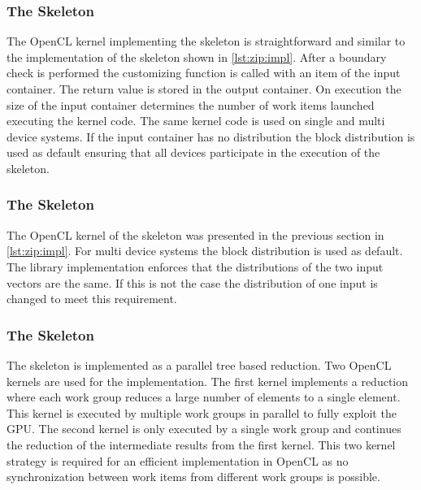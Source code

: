 \subsubsection{The \map Skeleton}
The OpenCL kernel implementing the \map skeleton is straightforward and similar to the implementation of the \zip skeleton shown in \autoref{lst:zip:impl}.
After a boundary check is performed the customizing function is called with an item of the input container.
The return value is stored in the output container.
On execution the size of the input container determines the number of work items launched executing the kernel code.
The same kernel code is used on single and multi device systems.
If the input container has no distribution the block distribution is used as default ensuring that all devices participate in the execution of the \map skeleton.






\subsubsection{The \zip Skeleton}
The OpenCL kernel of the \zip skeleton was presented in the previous section in \autoref{lst:zip:impl}.
For multi device systems the block distribution is used as default.
The \SkelCL library implementation enforces that the distributions of the two input vectors are the same.
If this is not the case the distribution of one input is changed to meet this requirement.





\subsubsection{The \reduce Skeleton}
The \reduce skeleton is implemented as a parallel tree based reduction.
Two OpenCL kernels are used for the implementation.
The first kernel implements a reduction where each work group reduces a large number of elements to a single element.
This kernel is executed by multiple work groups in parallel to fully exploit the GPU.
The second kernel is only executed by a single work group and continues the reduction of the intermediate results from the first kernel.
This two kernel strategy is required for an efficient implementation in OpenCL as no synchronization between work items from different work groups is possible.

